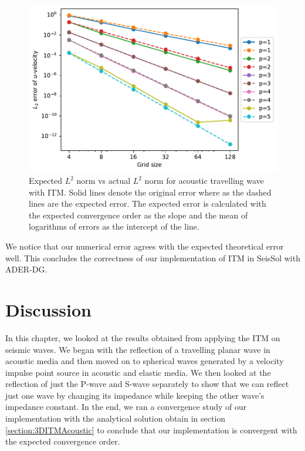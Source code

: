\begin{figure}[htpb]
    \centering
    \includegraphics[width=0.75\linewidth]{figures/error3.pdf}
    \caption{Expected $L^2$ norm vs actual $L^2$ norm for acoustic travelling wave with \ac{ITM}. Solid lines denote the original error where as the dashed lines are the expected error. The expected error is calculated with the expected convergence order
    as the slope and the mean of logarithms of errors as the intercept of the line.}
    \label{fig:expectedvsactualerror}
\end{figure}

We notice that our numerical error agrees with the expected theoretical error well. This concludes the correctness of our implementation of \ac{ITM} in SeisSol with \ac{ADER}-\ac{DG}.

\section{Discussion}
In this chapter, we looked at the results obtained from applying the \ac{ITM} on seismic waves. We began with the reflection of a travelling planar wave in acoustic media
and then moved on to spherical waves generated by a velocity impulse point source in acoustic and elastic media. 
We then looked at the reflection of just the P-wave and S-wave separately to show that we can reflect just one wave by changing its impedance while keeping the other wave's impedance constant.
In the end, we ran a convergence study of our implementation with the analytical solution obtain in section \ref{section:3DITMAcoustic} to conclude that our implementation
is convergent with the expected convergence order. \\